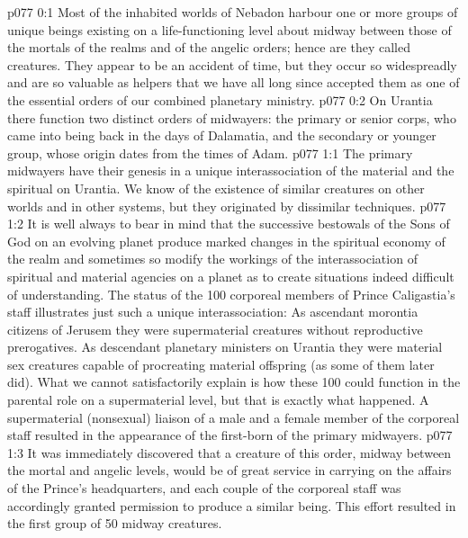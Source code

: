 \author{Archangel}
\vs p077 0:1 Most of the inhabited worlds of Nebadon harbour one or more groups of unique beings existing on a life\hyp{}functioning level about midway between those of the mortals of the realms and of the angelic orders; hence are they called  creatures. They appear to be an accident of time, but they occur so widespreadly and are so valuable as helpers that we have all long since accepted them as one of the essential orders of our combined planetary ministry.
\vs p077 0:2 On Urantia there function two distinct orders of midwayers: the primary or senior corps, who came into being back in the days of Dalamatia, and the secondary or younger group, whose origin dates from the times of Adam.
\vs p077 1:1 The primary midwayers have their genesis in a unique interassociation of the material and the spiritual on Urantia. We know of the existence of similar creatures on other worlds and in other systems, but they originated by dissimilar techniques.
\vs p077 1:2 It is well always to bear in mind that the successive bestowals of the Sons of God on an evolving planet produce marked changes in the spiritual economy of the realm and sometimes so modify the workings of the interassociation of spiritual and material agencies on a planet as to create situations indeed difficult of understanding. The status of the 100 corporeal members of Prince Caligastia’s staff illustrates just such a unique interassociation: As ascendant morontia citizens of Jerusem they were supermaterial creatures without reproductive prerogatives. As descendant planetary ministers on Urantia they were material sex creatures capable of procreating material offspring (as some of them later did). What we cannot satisfactorily explain is how these 100 could function in the parental role on a supermaterial level, but that is exactly what happened. A supermaterial (nonsexual) liaison of a male and a female member of the corporeal staff resulted in the appearance of the first\hyp{}born of the primary midwayers.
\vs p077 1:3 It was immediately discovered that a creature of this order, midway between the mortal and angelic levels, would be of great service in carrying on the affairs of the Prince’s headquarters, and each couple of the corporeal staff was accordingly granted permission to produce a similar being. This effort resulted in the first group of 50 midway creatures.
